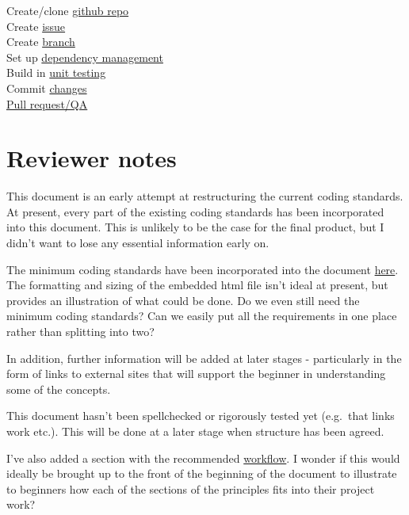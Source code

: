 \documentclass[]{book}
\begin{document}
Create/clone \protect\hyperlink{versioncontrol}{github repo}\\
Create \protect\hyperlink{versioncontrol}{issue}\\
Create \protect\hyperlink{versioncontrol}{branch}\\
Set up \protect\hyperlink{projdep}{dependency management}\\
Build in \protect\hyperlink{unittest}{unit testing}\\
Commit \protect\hyperlink{versioncontrol}{changes}\\
\protect\hyperlink{review}{Pull request/QA}

\hypertarget{reviewer-notes}{%
\chapter{Reviewer notes}\label{reviewer-notes}}

This document is an early attempt at restructuring the current coding standards. At present, every part of the existing coding standards has been incorporated into this document. This is unlikely to be the case for the final product, but I didn't want to lose any essential information early on.

The minimum coding standards have been incorporated into the document \protect\hyperlink{mcstable}{here}. The formatting and sizing of the embedded html file isn't ideal at present, but provides an illustration of what could be done. Do we even still need the minimum coding standards? Can we easily put all the requirements in one place rather than splitting into two?

In addition, further information will be added at later stages - particularly in the form of links to external sites that will support the beginner in understanding some of the concepts.

This document hasn't been spellchecked or rigorously tested yet (e.g.~that links work etc.). This will be done at a later stage when structure has been agreed.

I've also added a section with the recommended \protect\hyperlink{wf}{workflow}. I wonder if this would ideally be brought up to the front of the beginning of the document to illustrate to beginners how each of the sections of the principles fits into their project work?
\end{document}
